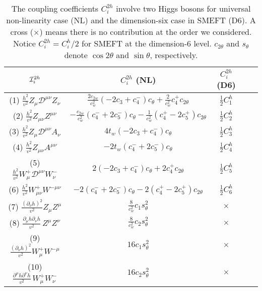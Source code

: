\begin{table}[!h]
\begin{center}
\caption{The coupling coefficients $C_i^{2h}$ involve two Higgs bosons  for universal  non-linearity case (NL) and the  dimension-six case in SMEFT (D6). A cross ($\times$) means there is no contribution at the order we considered. Notice $C_i^{2h}=C_i^h/2$ for  SMEFT at the dimension-6 level. $c_{2\theta}$ and $s_\theta$ denote $\cos 2\theta$ and $\sin\theta$, respectively.}\label{tab:twoh}
\begin{tabular}{c c c c c}
\hline\hline
${\cal I}^{ 2 h}_i$ &  $ C^{ 2h}_i$ (NL) &  $   C^{2h}_i$ (D6) \\
 \hline
(1) $  \frac{h^2}{v^2} Z_{\mu} {\mathcal{D}}^{\mu \nu} Z_{\nu}$ & $ \frac{2c_{ 2 w} }{c^2_{w}} ( - 2 c_3  +  c_4^-  ) c_\theta   +   \frac{2 }{c^2_{w}} c_4^+ c_{2 \theta}  $ & $\frac12 C_1^h$ 
 \\
(2) $  \frac{h^2}{v^2} Z_{\mu\nu} Z^{\mu\nu}$ & $ - \frac{c_{2 w}}{c^2_{w}}  (c_4^-  + 2 c_5^-  ) c_\theta   - \frac{1}{c^2_{w}}  (c_4^+ - 2 c_5^+ ) c_{2 \theta}   $ &$\frac12 C_2^h$ \\
(3) $  \frac{h^2}{v^2} Z_{\mu} {\mathcal{D}}^{\mu \nu} A_{\nu}$ & $ 4  t_{ w}  ( -2c_3   + c_4^- ) c_\theta $ & $\frac12 C_3^h$ \\
(4) $  \frac{h^2}{v^2} Z_{\mu\nu} A^{\mu\nu}$ & $ -2  t_{ w}   (   c_4^-  + 2 c_5^-  )  c_\theta $ &   $\frac12 C_4^h$  \\
(5)  $ \frac{h^2}{v^2} W^+_{\mu} {\mathcal{D}}^{\mu \nu} W^-_{\nu}$ & $ 2  (- 2c_3 + c_4^- ) c_\theta  + 2 c_4^+ c_{2 \theta}   $ & $\frac12 C_5^h$ \\
(6) $ \frac{h^2}{v^2} W^+_{\mu\nu} W^{-\mu\nu}$ & $  -2 ( c_4^- + 2 c_5^- )c_\theta   -2  (c_4^+  - 2 c_5^+ ) c_{2\theta}  $ &  $\frac12 C_6^h$\\
(7) $      \frac{(\partial_\nu h)^2} {v^2}Z_\mu Z^{ \mu}  $& $\frac{8 }{c^2_{w}}  c_1 s^2_\theta$ &  $\times$\\
(8)  $   \frac{\partial_\mu h \partial_\nu h}{v^2} \, Z^\mu Z^\nu  $& $\frac{8 }{c^2_{w}}  c_2  s^2_\theta$&  $\times$\\
(9) $      \frac{(\partial_\nu h)^2}{v^2} W^+_\mu W^{- \mu}  $& $16 c_1 s^2_\theta$ & $\times$ \\
(10) $  \frac{ \partial^\mu h \partial^\nu h }{v^2}\, W^+_{\mu} W^{-}_\nu  $& $16  c_2  s^2_\theta$ &  $\times$\\
\hline\hline
\end{tabular}
\end{center}
\end{table}



